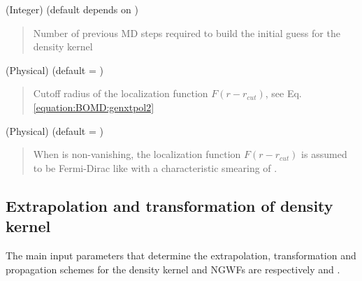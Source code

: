 \documentclass[letterpaper,10pt,english]{sphinxmanual}
\begin{document}
 (Integer) (default depends on )
\begin{quote}

\begin{DUlineblock}{0em}
\item[] Number of previous MD steps required to build the initial guess for the density kernel
\end{DUlineblock}
\end{quote}

 (Physical) (default = )
\begin{quote}

\begin{DUlineblock}{0em}
\item[] Cutoff radius of the localization function \(F(r-r_{cut})\), see Eq. \eqref{equation:BOMD:genxtpol2}
\end{DUlineblock}
\end{quote}

 (Physical) (default = )
\begin{quote}

\begin{DUlineblock}{0em}
\item[] When  is non-vanishing, the localization function \(F(r-r_{cut})\) is assumed to be Fermi-Dirac like with a characteristic smearing of .
\end{DUlineblock}
\end{quote}


\subsection{Extrapolation and transformation of density kernel}
\label{\detokenize{BOMD:extrapolation-and-transformation-of-density-kernel}}
The main input
parameters that determine the extrapolation, transformation and
propagation schemes for the density kernel and NGWFs are respectively
 and .
\end{document}
